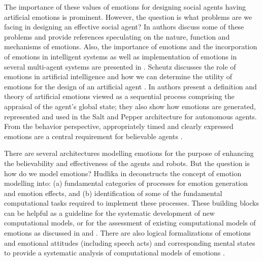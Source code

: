 \documentclass[12pt]{report}
\begin{document}
The importance of these values of emotions for designing social agents having
artificial emotions is prominent. However, the question is what problems are we
facing in designing an effective social agent? In
\cite{freitas:artificial-emotions-ready} authors discuss some of these problems
and provide references speculating on the nature, function and mechanisms of
emotions. Also, the importance of emotions and the incorporation of emotions in
intelligent systems as well as implementation of emotions in several multi-agent
systems are presented in \cite{miranda:emotions-humans-ai}. Scheutz discusses
the role of emotions in artificial intelligence and how we can determine the
utility of emotions for the design of an artificial agent
\cite{scheutz:emotion-role}. In \cite{botelho:machinery-emotions} authors
present a definition and theory of artificial emotions viewed as a sequential
process comprising the appraisal of the agent's global state; they also show how
emotions are generated, represented and used in the Salt and Pepper architecture
for autonomous agents. From the behavior perspective, appropriately timed and
clearly expressed emotions are a central requirement for believable agents
\cite{bates:emotion-roles}.

There are several architectures modelling emotions for the purpose of enhancing
the believability and effectiveness of the agents and robots. But the question
is how do we model emotions? Hudlika in \cite{hudlicka:modeling-emotion}
deconstructs the concept of emotion modelling into: (a) fundamental categories
of processes for emotion generation and emotion effects, and (b) identification
of some of the fundamental computational tasks required to implement these
processes. These building blocks can be helpful as a guideline for the
systematic development of new computational models, or for the assessment of
existing computational models of emotions as discussed in
\cite{lin:computational-models-emotion} and \cite{marsella:computational}. There
are also logical formalizations of emotions and emotional attitudes (including
speech acts) and corresponding mental states to provide a systematic analysis
of computational models of emotions \cite{adam:logical-formalization,
grant:model-intention-formation, guiraud:emotions-formalization-speech-acts}.
\end{document}

